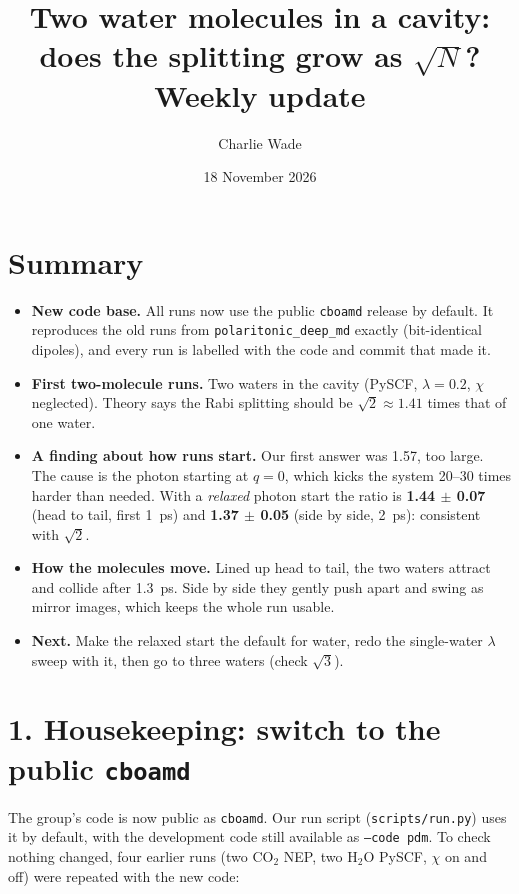 \documentclass[11pt]{article}
\title{Two water molecules in a cavity: does the splitting grow as $\sqrt{N}$?\\[2pt]\large Weekly update}
\author{Charlie Wade}
\date{18 November 2026}
\begin{document}
\maketitle

\section*{Summary}

\begin{itemize}
  \item \textbf{New code base.} All runs now use the public \texttt{cboamd} release by
        default. It reproduces the old runs from \texttt{polaritonic\_deep\_md} exactly
        (bit-identical dipoles), and every run is labelled with the code and commit
        that made it.
  \item \textbf{First two-molecule runs.} Two waters in the cavity (PySCF, $\lambda=0.2$,
        $\chi$ neglected). Theory says the Rabi splitting should be $\sqrt2\approx1.41$
        times that of one water.
  \item \textbf{A finding about how runs start.} Our first answer was 1.57, too large. The
        cause is the photon starting at $q=0$, which kicks the system 20--30 times harder
        than needed. With a \emph{relaxed} photon start the ratio is
        \textbf{1.44 $\pm$ 0.07} (head to tail, first 1~ps) and \textbf{1.37 $\pm$ 0.05}
        (side by side, 2~ps): consistent with $\sqrt2$.
  \item \textbf{How the molecules move.} Lined up head to tail, the two waters attract and
        collide after 1.3~ps. Side by side they gently push apart and swing as mirror
        images, which keeps the whole run usable.
  \item \textbf{Next.} Make the relaxed start the default for water, redo the single-water
        $\lambda$ sweep with it, then go to three waters (check $\sqrt3$).
\end{itemize}

\section*{1. Housekeeping: switch to the public \texttt{cboamd}}

The group's code is now public as \texttt{cboamd}. Our run script
(\texttt{scripts/run.py}) uses it by default, with the development code still available
as \texttt{--code pdm}. To check nothing changed, four earlier runs (two CO$_2$ NEP, two
H$_2$O PySCF, $\chi$ on and off) were repeated with the new code:
\end{document}
